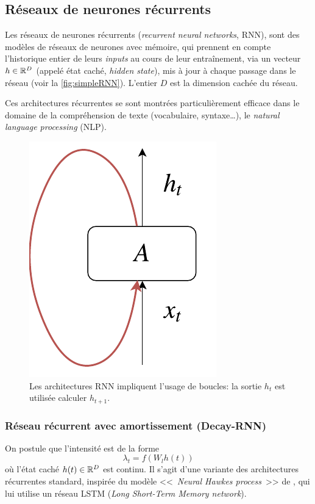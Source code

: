 \documentclass[../main.tex]{subfiles}
\begin{document}
\subsection{Réseaux de neurones récurrents}

Les réseaux de neurones récurrents (\textit{recurrent neural networks}, RNN), sont des modèles de réseaux de neurones avec mémoire, qui prennent en compte l'historique entier de leurs \textit{inputs} au cours de leur entraînement, via un vecteur $h\in\mathbb{R}^D$ (appelé état caché, \textit{hidden state}), mis à jour à chaque passage dans le réseau (voir la \autoref{fig:simpleRNN}). L'entier $D$ est la dimension cachée du réseau.

Ces architectures récurrentes se sont montrées particulièrement efficace dans le domaine de la compréhension de texte (vocabulaire, syntaxe\ldots), le \textit{natural language processing} (NLP). \cite{unreasonableEffectivenessRNN}

\begin{figure}
	\centering
	\includegraphics[height=0.2\textheight]{diagrams/rnn.pdf}
	\caption{Les architectures RNN impliquent l'usage de boucles: la sortie $h_t$ est utilisée calculer $h_{t+1}$.}\label{fig:simpleRNN}
\end{figure}

\subsubsection{Réseau récurrent avec amortissement (Decay-RNN)}

On postule que l'intensité est de la forme
\begin{equation}\label{eq:decayrnnhiddenstate}
\lambda_t = f(W_l h(t))
\end{equation}
où l'état caché $h(t)\in\mathbb{R}^D$ est continu. Il s'agit d'une variante des architectures récurrentes standard, inspirée du modèle <<~\textit{Neural Hawkes process}~>> de \citeauthor{meiEisnerNeuralHawkes} \cite{meiEisnerNeuralHawkes}, qui lui utilise un réseau LSTM (\textit{Long Short-Term Memory network}).
\end{document}
